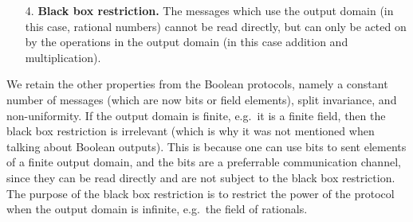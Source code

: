 \begin{enumerate}
    \item[4.] \textbf{Black box restriction.} The messages which use the output domain (in this case, rational numbers) cannot be read directly, but can only be acted on by the operations in the output domain (in this case addition and multiplication).
\end{enumerate}
We retain the other properties from the Boolean protocols, namely a constant number of messages (which are now bits or field elements), split invariance, and non-uniformity. 
 If the output domain is finite, e.g.~it is a finite field, then the black box restriction is irrelevant (which is why it was not mentioned when talking about Boolean outputs). This is because one can use bits to sent elements of a finite output domain, and the bits are a preferrable communication channel, since they can be read directly and are not subject to the black box restriction. The purpose of the black box restriction is to restrict the power of the protocol when the output domain is infinite, e.g.~the field of rationals.

